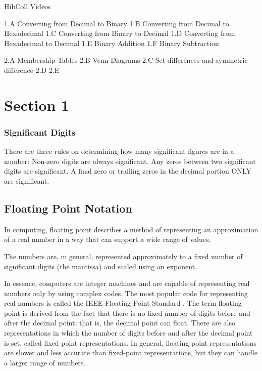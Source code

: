 \documentclass[]{report}
\begin{document}
HibColl Videos


1.A  Converting from Decimal to Binary
1.B  Converting from Decimal to Hexadecimal
1.C  Converting from Binary to Decimal
1.D  Converting from Hexadecimal to Decimal
1.E  Binary Addition
1.F  Binary Subtraction


2.A  Membership Tables
2.B  Venn Diagrams
2.C  Set differences and symmetric difference
2.D  
2.E



\chapter{Section 1}
\subsection{Significant Digits}
There are three rules on determining how many significant figures are in a number: Non-zero digits are always significant. Any zeros between two significant digits are significant. A final zero or trailing zeros in the decimal portion ONLY are significant.

\section{Floating Point Notation}



In computing, floating point describes a method of 
representing an approximation of a real number in a 
way that can support a wide range of values. 


The numbers are, in general, represented approximately 
to a fixed number of significant digits (the mantissa) and scaled using an exponent. 

In essence, computers are integer machines and are capable of representing real numbers only by using complex codes. The most popular code for representing real numbers is called the IEEE Floating-Point Standard .
The term floating point is derived from the fact that there is no fixed number of digits before and after the decimal point; that is, the decimal point can float. There are also representations in 
which the number of digits before and after the decimal point is set, called fixed-point representations. In general, floating-point representations are slower and less accurate than fixed-point representations, but they can handle a larger range of numbers.
\end{document}
